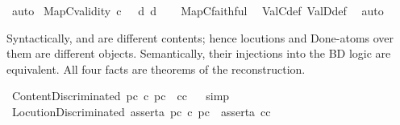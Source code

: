 \begin{isabellebody}
\ auto%
\endisatagproof
{\isafoldproof}%
%
\isadelimproof
\isanewline
%
\endisadelimproof
\isanewline
{}\isamarkupfalse%
\ MapC{\isacharunderscore}{\kern0pt}validity{\isacharcolon}{\kern0pt}\ {\isachardoublequoteopen}{\isacharparenleft}{\kern0pt}{\isasymTurnstile}\isactrlsup c\ {\isasymphi}{\isacharparenright}{\kern0pt}\ {\isasymlongleftrightarrow}\ {\isacharparenleft}{\kern0pt}{\isasymTurnstile}\isactrlsup d\ {\isacharbraceleft}{\kern0pt}{\isasymphi}{\isacharbraceright}{\kern0pt}\isactrlsup d{\isacharparenright}{\kern0pt}{\isachardoublequoteclose}\isanewline
%
\isadelimproof
\ \ %
\endisadelimproof
%
\isatagproof
{}\isamarkupfalse%
\ MapC{\isacharunderscore}{\kern0pt}faithful\ \isamarkupfalse%
\ ValC{\isacharunderscore}{\kern0pt}def\ ValD{\isacharunderscore}{\kern0pt}def\ \isamarkupfalse%
\ auto%
\endisatagproof
{\isafoldproof}%
%
\isadelimproof
%
\endisadelimproof
%
\isadelimdocument
%
\endisadelimdocument
%
\isatagdocument
%
\isamarkuptrue%
%
\endisatagdocument
{\isafolddocument}%
%
\isadelimdocument
%
\endisadelimdocument
%
\begin{isamarkuptext}%
Syntactically,  and  are different contents; hence locutions and
Done-atoms over them are different objects. Semantically, their injections into the
BD logic are equivalent. All four facts are theorems of the reconstruction.%
\end{isamarkuptext}\isamarkuptrue%
\isamarkupfalse%
\ ContentDiscriminated{\isacharcolon}{\kern0pt}\ {\isachardoublequoteopen}{\isacharparenleft}{\kern0pt}p\isactrlsup c\ {\isasymsupset}\isactrlsup c\ p\isactrlsup c{\isacharparenright}{\kern0pt}\ {\isasymnoteq}\ {\isasymnot}\isactrlsup c{\isasymbottom}\isactrlsup c{\isachardoublequoteclose}%
\isadelimproof
\ %
\endisadelimproof
%
\isatagproof
{}\isamarkupfalse%
\ simp%
\endisatagproof
{\isafoldproof}%
%
\isadelimproof
%
\endisadelimproof
\isanewline
{}\isamarkupfalse%
\ LocutionDiscriminated{\isacharcolon}{\kern0pt}\ {\isachardoublequoteopen}assert{\isacharbrackleft}{\kern0pt}a{\isacharcomma}{\kern0pt}\ p\isactrlsup c\ {\isasymsupset}\isactrlsup c\ p\isactrlsup c{\isacharbrackright}{\kern0pt}\ {\isasymnoteq}\ assert{\isacharbrackleft}{\kern0pt}a{\isacharcomma}{\kern0pt}\ {\isasymnot}\isactrlsup c{\isasymbottom}\isactrlsup c{\isacharbrackright}{\kern0pt}{\isachardoublequoteclose}%

\end{isabellebody}
